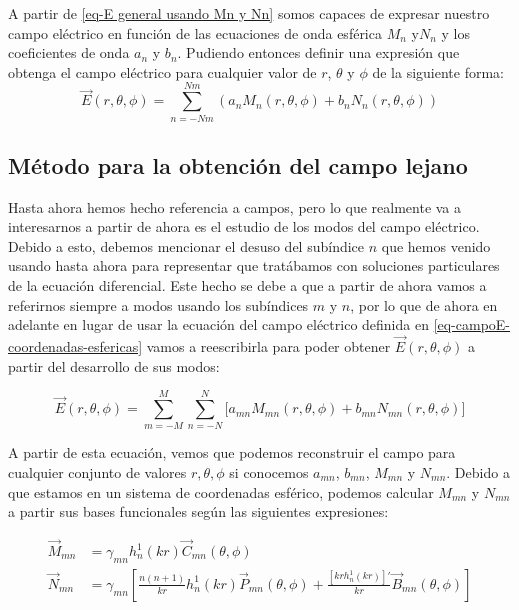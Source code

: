 \newpage

A partir de \eqref{eq-E general usando Mn y Nn} somos capaces de expresar nuestro campo eléctrico en función de las ecuaciones de onda esférica $M_{n}$ y$N_{n}$ y los coeficientes de onda $a_{n}$ y $b_{n}$. Pudiendo entonces definir una expresión que obtenga el campo eléctrico para cualquier valor de $r$, $\theta$ y $\phi$ de la siguiente forma:
\begin{equation}
\vec{E}(r,\theta,\phi)=\sum_{n=-Nm}^{Nm}(a_{n}M_{n}(r,\theta,\phi)+b_{n}N_{n}(r,\theta,\phi))
\label{eq-campoE-coordenadas-esfericas}
\end{equation}

\newpage

\subsection{Método para la obtención del campo lejano}

Hasta ahora hemos hecho referencia a campos, pero lo que realmente va a interesarnos a partir de ahora es el estudio de los  modos del campo eléctrico. Debido a esto, debemos mencionar el desuso  del subíndice $n$ que hemos venido usando hasta ahora para representar que tratábamos con soluciones particulares de la ecuación diferencial. Este hecho se debe a que a partir de ahora vamos a referirnos siempre a modos usando los subíndices $m$ y $n$, por lo que de ahora en adelante en lugar de usar la ecuación del campo eléctrico definida en \eqref{eq-campoE-coordenadas-esfericas} vamos a reescribirla para poder obtener $\vec{E}(r,\theta,\phi)$ a partir del desarrollo de sus modos:

\begin{equation}
\vec{E}(r,\theta,\phi)=\sum_{m=-M}^{M}\sum_{n=-N}^{N}\big[a_{mn}M_{mn}(r,\theta,\phi)+b_{mn}N_{mn}(r,\theta,\phi)\big]
\label{eq-campoE-coordenadas-esfericas-a-partir-de-sus-modos}
\end{equation}

A partir de esta ecuación, vemos que podemos reconstruir el campo para cualquier conjunto de valores $r, \theta, \phi$ si conocemos $a_{mn}$, $b_{mn}$, $M_{mn}$ y $N_{mn}$. Debido a que estamos en un sistema de coordenadas esférico, podemos calcular $M_{mn}$ y $N_{mn}$ a partir sus bases funcionales según las siguientes expresiones:

\begin{align}
\vec{M}_{mn} &= \gamma_{mn} h^{1}_n(kr) \vec{C}_{mn}(\theta, \phi) \label{NF2FF:Base funcional Mmn} \\
 \vec{N}_{mn} &= \gamma_{mn} \left[ \frac{n(n + 1)}{kr} h^{1}_n(kr) \vec{P}_{mn}(\theta, \phi) + \frac{\left[kr h^{1}_n(kr)\right]'}{kr} \vec{B}_{mn}(\theta, \phi) \right] \label{NF2FF:Base funcional Nmn}
\end{align}

